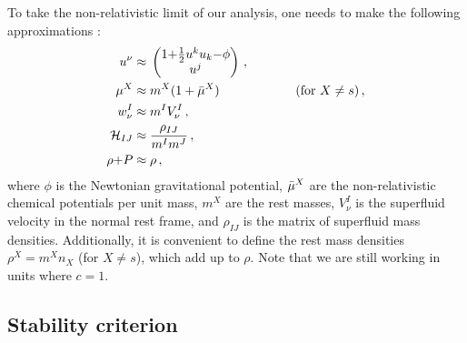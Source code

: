 \documentclass[a4paper, amsfonts, amssymb, amsmath, reprint, showkeys, nofootinbib, twoside,notitlepage,onecolumn]{revtex4-2}
\newcommand{\spc}{\quad \quad \quad}
\theoremstyle{definition}
\theoremstyle{theorem}
\theoremstyle{corollary}
\begin{document}
To take the non-relativistic limit of our analysis, one needs to make the following approximations \cite{rezzolla_book,GusakovAndersson2006}:
\begin{equation}
\begin{split}
u^\nu \approx {}& 
\begin{pmatrix}
1{+}\frac{1}{2}u^ku_k {-} \phi \\
u^j \\
\end{pmatrix} \, , \\
\mu^X \approx{}& m^X (1+\Bar{\mu}^X) \spc \spc (\text{for }X\neq s)\, , \\
w^I_\nu \approx{}& m^I V^I_\nu \, , \\
\mathcal{H}_{IJ} \approx{}& \dfrac{\rho_{IJ}}{m^I m^J} \, , \\
\rho{+}P \approx{}& \rho \, , \\
\end{split}
\end{equation}
where $\phi$ is the Newtonian gravitational potential, $\Bar{\mu}^X$ are the non-relativistic chemical potentials per unit mass, $m^X$ are the rest masses, $V^I_\nu$ is the superfluid velocity in the normal rest frame, and $\rho_{IJ}$ is the matrix of superfluid mass densities. Additionally, it is convenient to define the rest mass densities $\rho^X{=}m^Xn_X$ (for $X {\neq} s$), which add up to $\rho$. Note that we are still working in units where $c=1$.

\vspace{-0.3cm}
\subsection{Stability criterion}
\vspace{-0.2cm}
\end{document}
